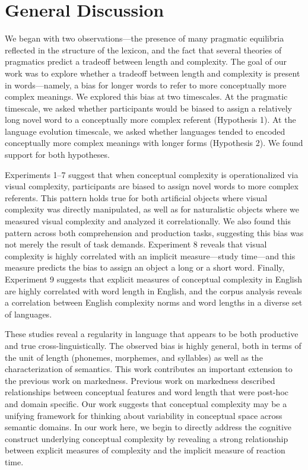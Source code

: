 \documentclass[man]{apa2}
\begin{document}
\section{General Discussion}

We began with two observations---the presence of many pragmatic equilibria reflected in the structure of the lexicon, and the fact that several theories of pragmatics predict a tradeoff between length and complexity. The goal of our work was to explore whether a tradeoff between length and complexity is present in words---namely, a bias for longer words to refer to more conceptually more complex meanings. We explored this bias at two timescales. At the pragmatic timescale, we asked whether participants would be biased to assign a relatively long novel word to a conceptually more complex referent (Hypothesis 1). At the language evolution timescale, we asked whether languages tended to encoded conceptually more complex meanings with longer forms (Hypothesis 2). We found support for both hypotheses.

Experiments 1--7 suggest that when conceptual complexity is operationalized via visual complexity, participants are biased to assign novel words to more complex referents. This pattern holds true for both artificial objects where visual complexity was directly manipulated, as well as for naturalistic objects where we measured visual complexity and analyzed it correlationally. We also found this pattern across both comprehension and production tasks, suggesting this bias was not merely the result of task demands. Experiment 8 reveals that visual complexity is highly correlated with an implicit measure---study time---and this measure predicts the bias to assign an object a long or a short word. Finally, Experiment 9 suggests that explicit measures of conceptual complexity in English are highly correlated with word length in English, and the corpus analysis reveals a correlation between English complexity norms and word lengths in a diverse set of languages. 

These studies reveal a regularity in language that appears to be both productive and true cross-linguistically. The observed bias is highly general, both in terms of the unit of length (phonemes, morphemes, and syllables) as well as the characterization of semantics. This work contributes an important extension to the previous work on markedness. Previous work on markedness described relationships between conceptual features and word length that were post-hoc and domain specific. Our work suggests that conceptual complexity may be a unifying framework for thinking about variability in conceptual space across semantic domains. In our work here, we begin to directly address the cognitive construct underlying conceptual complexity by revealing a strong relationship between explicit measures of complexity and the implicit measure of reaction time. 
\end{document}
